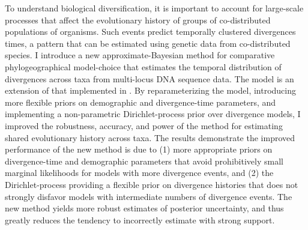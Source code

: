 To understand biological diversification, it is important to account for
large-scale processes that affect the evolutionary history of groups of
co-distributed populations of organisms.
Such events predict temporally clustered divergences times, a pattern
that can be estimated using genetic data from co-distributed species.
I introduce a new approximate-Bayesian method for comparative
phylogeographical model-choice that estimates the temporal distribution of
divergences across taxa from multi-locus DNA sequence data.
The model is an extension of that implemented in \msb.
By reparameterizing the model, introducing more flexible priors on
demographic and divergence-time parameters, and implementing a
non-parametric Dirichlet-process prior over divergence models, I improved
the robustness, accuracy, and power of the method for estimating shared
evolutionary history across taxa.
The results demonstrate the improved performance of the new method is due
to (1) more appropriate priors on divergence-time and demographic
parameters that avoid prohibitively small marginal likelihoods for models
with more divergence events,
and (2) the Dirichlet-process providing a flexible prior on divergence
histories that does not strongly disfavor models with intermediate numbers
of divergence events.
The new method yields more robust estimates of posterior uncertainty, and
thus greatly reduces the tendency to incorrectly estimate
 with strong support.
